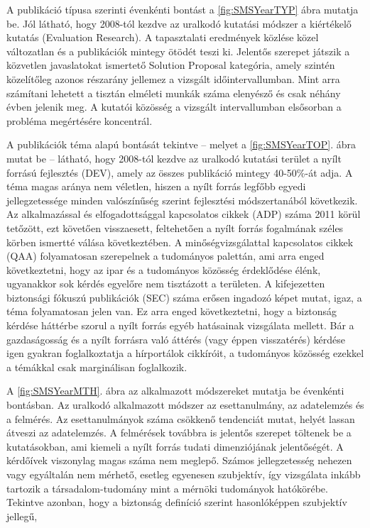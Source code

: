 \documentclass[12pt,magyar,a4paper,oneside]{scrreprt}
\begin{document}
A publikáció típusa szerinti évenkénti bontást a \ref{fig:SMSYearTYP}
ábra mutatja be. Jól látható, hogy 2008-tól kezdve az uralkodó kutatási
módszer a kiértékelő kutatás (Evaluation Research). A tapasztalati
eredmények közlése közel változatlan és a publikációk mintegy ötödét
teszi ki. Jelentős szerepet játszik a közvetlen javaslatokat ismertető
Solution Proposal kategória, amely szintén közelítőleg azonos részarány
jellemez a vizsgált időintervallumban. Mint arra számítani lehetett a
tisztán elméleti munkák száma elenyésző és csak néhány évben jelenik
meg. A kutatói közösség a vizsgált intervallumban elsősorban a probléma
megértésére koncentrál.

A publikációk téma alapú bontását tekintve -- melyet a
\ref{fig:SMSYearTOP}. ábra mutat be -- látható, hogy 2008-tól kezdve az
uralkodó kutatási terület a nyílt forrású fejlesztés (DEV), amely az
összes publikáció mintegy 40-50\%-át adja. A téma magas aránya nem
véletlen, hiszen a nyílt forrás legfőbb egyedi jellegzetessége minden
valószínűség szerint fejlesztési módszertanából következik. Az
alkalmazással és elfogadottsággal kapcsolatos cikkek (ADP) száma 2011
körül tetőzött, ezt követően visszaesett, feltehetően a nyílt forrás
fogalmának széles körben ismertté válása következtében. A
minőségvizsgálattal kapcsolatos cikkek (QAA) folyamatosan szerepelnek a
tudományos palettán, ami arra enged következtetni, hogy az ipar és a
tudományos közösség érdeklődése élénk, ugyanakkor sok kérdés egyelőre
nem tisztázott a területen. A kifejezetten biztonsági fókuszú
publikációk (SEC) száma erősen ingadozó képet mutat, igaz, a téma
folyamatosan jelen van. Ez arra enged következtetni, hogy a biztonság
kérdése háttérbe szorul a nyílt forrás egyéb hatásainak vizsgálata
mellett. Bár a gazdaságosság és a nyílt forrásra való áttérés (vagy
éppen visszatérés) kérdése igen gyakran foglalkoztatja a hírportálok
cikkíróit, a tudományos közösség ezekkel a témákkal csak marginálisan
foglalkozik.

A \ref{fig:SMSYearMTH}. ábra az alkalmazott módszereket mutatja be
évenkénti bontásban. Az uralkodó alkalmazott módszer az esettanulmány,
az adatelemzés és a felmérés. Az esettanulmányok száma csökkenő
tendenciát mutat, helyét lassan átveszi az adatelemzés. A felmérések
továbbra is jelentős szerepet töltenek be a kutatásokban, ami kiemeli a
nyílt forrás tudati dimenziójának jelentőségét. A kérdőívek viszonylag
magas száma nem meglepő. Számos jellegzetesség nehezen vagy egyáltalán
nem mérhető, esetleg egyenesen szubjektív, így vizsgálata inkább
tartozik a társadalom-tudomány mint a mérnöki tudományok hatókörébe.
Tekintve azonban, hogy a biztonság definíció szerint hasonlóképpen
szubjektív jellegű,
\end{document}
